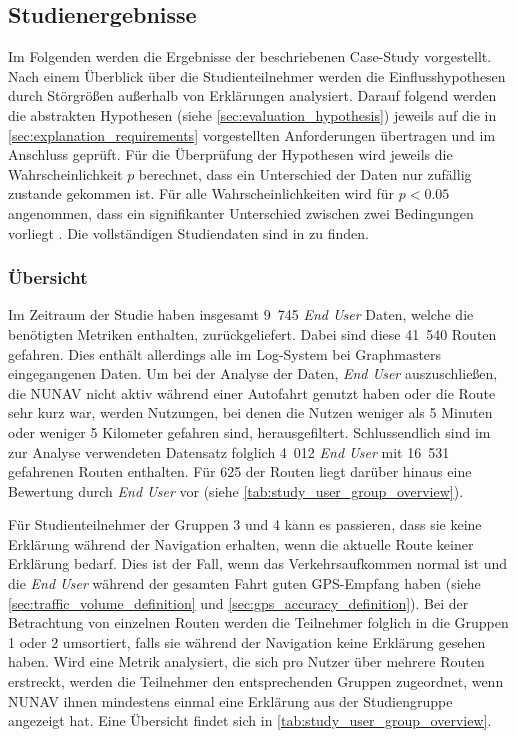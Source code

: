 \subsection{Studienergebnisse}
\label{sec:study_results_quantitativ}

Im Folgenden werden die Ergebnisse der beschriebenen Case-Study vorgestellt. Nach einem Überblick über die Studienteilnehmer werden die Einflusshypothesen durch Störgrößen außerhalb von Erklärungen analysiert. Darauf folgend werden die abstrakten Hypothesen (siehe \autoref{sec:evaluation_hypothesis}) jeweils auf die in \autoref{sec:explanation_requirements} vorgestellten Anforderungen übertragen und im Anschluss geprüft. Für die Überprüfung der Hypothesen wird jeweils die Wahrscheinlichkeit $ p $ berechnet, dass ein Unterschied der Daten nur zufällig zustande gekommen ist. Für alle Wahrscheinlichkeiten wird für $ p < 0.05 $ angenommen, dass ein signifikanter Unterschied zwischen zwei Bedingungen vorliegt \cite[vgl.][]{wohlin2012experimentation}. Die vollständigen Studiendaten sind in  zu finden.

\subsubsection{Übersicht}

Im Zeitraum der Studie haben insgesamt 9~745 \textit{End User} Daten, welche die benötigten Metriken enthalten, zurückgeliefert. Dabei sind diese 41~540 Routen gefahren. Dies enthält allerdings alle im Log-System bei Graphmasters eingegangenen Daten. Um bei der Analyse der Daten, \textit{End User} auszuschließen, die NUNAV nicht aktiv während einer Autofahrt genutzt haben oder die Route sehr kurz war, werden Nutzungen, bei denen die Nutzen weniger als 5 Minuten oder weniger 5 Kilometer gefahren sind, herausgefiltert. Schlussendlich sind im zur Analyse verwendeten Datensatz folglich 4~012 \textit{End User} mit 16~531 gefahrenen Routen enthalten. Für 625 der Routen liegt darüber hinaus eine Bewertung durch \textit{End User} vor (siehe \autoref{tab:study_user_group_overview}).

Für Studienteilnehmer der Gruppen 3 und 4 kann es passieren, dass sie keine Erklärung während der Navigation erhalten, wenn die aktuelle Route keiner Erklärung bedarf. Dies ist der Fall, wenn das Verkehrsaufkommen \glqq normal\grqq{} ist und die \textit{End User} während der gesamten Fahrt guten GPS-Empfang haben (siehe \autoref{sec:traffic_volume_definition} und \autoref{sec:gps_accuracy_definition}). Bei der Betrachtung von einzelnen Routen werden die Teilnehmer folglich in die Gruppen 1 oder 2 umsortiert, falls sie während der Navigation keine Erklärung gesehen haben. Wird eine Metrik analysiert, die sich pro Nutzer über mehrere Routen erstreckt, werden die Teilnehmer den entsprechenden Gruppen zugeordnet, wenn NUNAV ihnen mindestens einmal eine Erklärung aus der Studiengruppe angezeigt hat. Eine Übersicht findet sich in \autoref{tab:study_user_group_overview}.

